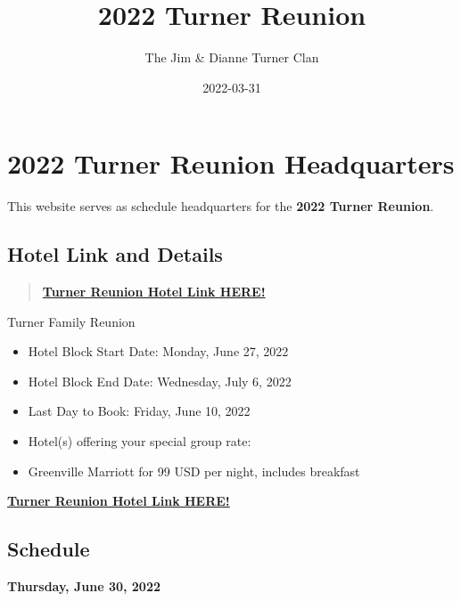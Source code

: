 \documentclass[
]{book}
\title{2022 Turner Reunion}
\author{The Jim \& Dianne Turner Clan}
\date{2022-03-31}
\providecommand{\tightlist}{%
  \setlength{\itemsep}{0pt}\setlength{\parskip}{0pt}}
\begin{document}
\maketitle

{
\setcounter{tocdepth}{1}
\tableofcontents
}
\hypertarget{turner-reunion-headquarters}{%
\chapter*{2022 Turner Reunion Headquarters}\label{turner-reunion-headquarters}}

This website serves as schedule headquarters for the \textbf{2022 Turner Reunion}.

\hypertarget{hotel-link-and-details}{%
\section*{Hotel Link and Details}\label{hotel-link-and-details}}

\begin{quote}
\textbf{\href{https://www.marriott.com/events/start.mi?id=1628261049761\&key=GRP}{Turner Reunion Hotel Link HERE!}}
\end{quote}

Turner Family Reunion

\begin{itemize}
\tightlist
\item
  Hotel Block Start Date: Monday, June 27, 2022
\item
  Hotel Block End Date: Wednesday, July 6, 2022
\item
  Last Day to Book: Friday, June 10, 2022
\item
  Hotel(s) offering your special group rate:
\item
  Greenville Marriott for 99 USD per night, includes breakfast
\end{itemize}

\textbf{\href{https://www.marriott.com/events/start.mi?id=1628261049761\&key=GRP}{Turner Reunion Hotel Link HERE!}}

\hypertarget{schedule}{%
\section*{Schedule}\label{schedule}}

\textbf{Thursday, June 30, 2022}
\end{document}
